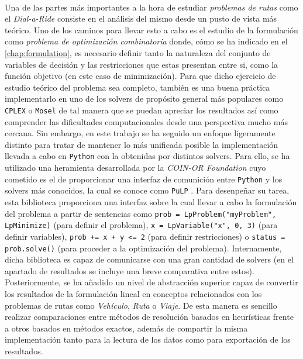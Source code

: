 \documentclass{subfiles}
\begin{document}
        \paragraph{}
        Una de las partes más importantes a la hora de estudiar \emph{problemas de rutas} como el \emph{Dial-a-Ride} consiste en el análisis del mismo desde un pusto de vista más teórico. Uno de los caminos para llevar esto a cabo es el estudio de la formulación como \emph{problema de optimización combinatoria} donde, cómo se ha indicado en el \cref{chap:formulation}, es necesario definir tanto la naturaleza del conjunto de variables de decisión y las restricciones que estas presentan entre si, como la función objetivo (en este caso de minimización). Para que dicho ejercicio de estudio teórico del problema sea completo, también es una buena práctica implementarlo en uno de los solvers de propósito general más populares como \texttt{CPLEX} o \texttt{Mosel} de tal manera que se puedan apreciar los resultados así como comprender las dificultades computacionales desde una perspectiva mucho más cercana. Sin embargo, en este trabajo se ha seguido un enfoque ligeramente distinto para tratar de mantener lo más unificada posible la implementación llevada a cabo en \texttt{Python} con la obtenidas por distintos solvers. Para ello, se ha utilizado una heramienta desarrollada por la \emph{COIN-OR Foundation} cuyo cometido es el de proporcionar una interfaz de comunición entre \texttt{Python} y los solvers más conocidos, la cual se conoce como \texttt{PuLP} \cite{mitchell2011pulp}. Para desenpeñar su tarea, esta biblioteca proporciona una interfaz sobre la cual llevar a cabo la formulación del problema a partir de sentencias como \verb|prob = LpProblem("myProblem", LpMinimize)| (para definir el problema), \verb|x = LpVariable("x", 0, 3)| (para definir variables), \verb|prob += x + y <= 2| (para definir restricciones) o \verb|status = prob.solve()| (para proceder a la optimización del problema). Internamente, dicha biblioteca es capaz de comunicarse con una gran cantidad de solvers (en el apartado de resultados se incluye una breve comparativa entre estos). Posteriormente, se ha añadido un nivel de abstracción superior capaz de convertir los resultados de la formulación lineal en conceptos relacionados con los problemas de rutas como \emph{Vehículo}, \emph{Ruta} o \emph{Viaje}. De esta manera es sencillo realizar comparaciones entre métodos de resolución basados en heurísticas frente a otros basados en métodos exactos, además de compartir la misma implementación tanto para la lectura de los datos como para exportación de los resultados.
\end{document}
